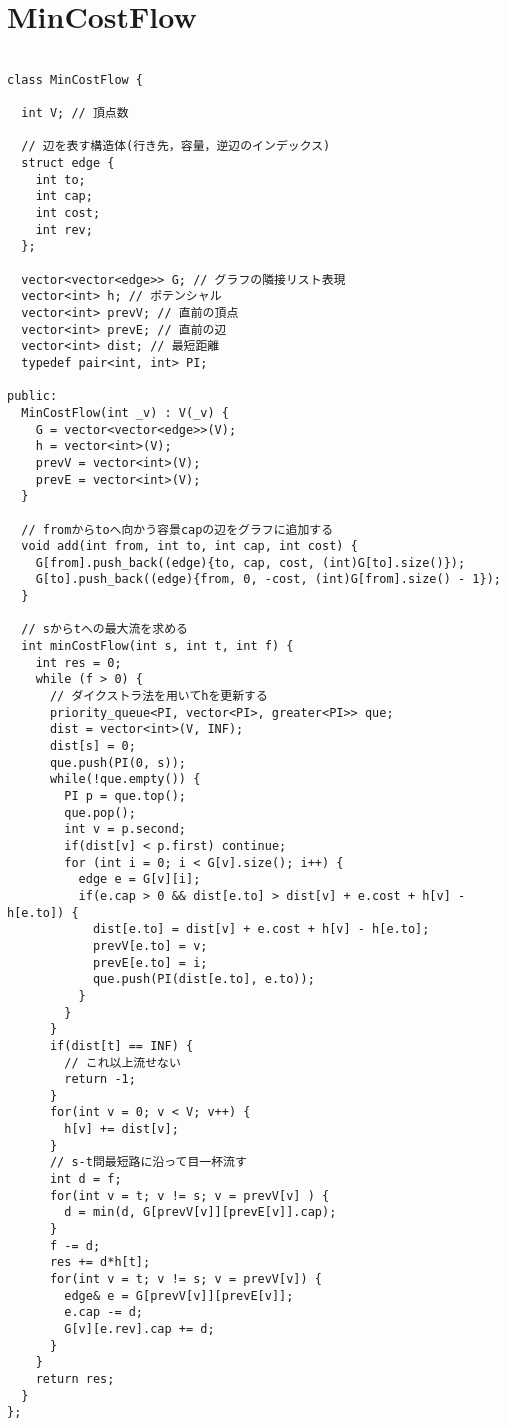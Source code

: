 \documentclass{jsarticle}
\begin{document}
\section{MinCostFlow}
\color{black}
\begin{lstlisting}[caption=MinCostFlow]

class MinCostFlow {

  int V; // 頂点数

  // 辺を表す構造体(行き先，容量，逆辺のインデックス)
  struct edge {
    int to;
    int cap;
    int cost;
    int rev;
  };

  vector<vector<edge>> G; // グラフの隣接リスト表現
  vector<int> h; // ポテンシャル
  vector<int> prevV; // 直前の頂点
  vector<int> prevE; // 直前の辺
  vector<int> dist; // 最短距離
  typedef pair<int, int> PI;

public:
  MinCostFlow(int _v) : V(_v) {
    G = vector<vector<edge>>(V);
    h = vector<int>(V);
    prevV = vector<int>(V);
    prevE = vector<int>(V);
  }

  // fromからtoへ向かう容景capの辺をグラフに追加する
  void add(int from, int to, int cap, int cost) {
    G[from].push_back((edge){to, cap, cost, (int)G[to].size()});
    G[to].push_back((edge){from, 0, -cost, (int)G[from].size() - 1});
  }

  // sからtへの最大流を求める
  int minCostFlow(int s, int t, int f) {
    int res = 0;
    while (f > 0) {
      // ダイクストラ法を用いてhを更新する
      priority_queue<PI, vector<PI>, greater<PI>> que;
      dist = vector<int>(V, INF);
      dist[s] = 0;
      que.push(PI(0, s));
      while(!que.empty()) {
        PI p = que.top();
        que.pop();
        int v = p.second;
        if(dist[v] < p.first) continue;
        for (int i = 0; i < G[v].size(); i++) {
          edge e = G[v][i];
          if(e.cap > 0 && dist[e.to] > dist[v] + e.cost + h[v] - h[e.to]) {
            dist[e.to] = dist[v] + e.cost + h[v] - h[e.to];
            prevV[e.to] = v;
            prevE[e.to] = i;
            que.push(PI(dist[e.to], e.to));
          }
        }
      }
      if(dist[t] == INF) {
        // これ以上流せない
        return -1;
      }
      for(int v = 0; v < V; v++) {
        h[v] += dist[v];
      }
      // s-t問最短路に沿って目一杯流す
      int d = f;
      for(int v = t; v != s; v = prevV[v] ) {
        d = min(d, G[prevV[v]][prevE[v]].cap);
      }
      f -= d;
      res += d*h[t];
      for(int v = t; v != s; v = prevV[v]) {
        edge& e = G[prevV[v]][prevE[v]];
        e.cap -= d;
        G[v][e.rev].cap += d;
      }
    }
    return res;
  }
};

\end{lstlisting}
\end{document}
